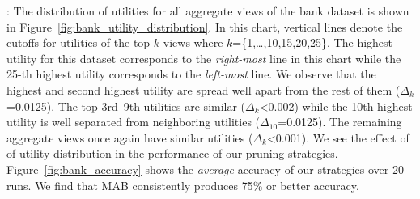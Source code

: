 :
The distribution of utilities for all aggregate views of the bank dataset is
shown in Figure~\ref{fig:bank_utility_distribution}. 
In this chart, vertical lines denote the cutoffs for utilities of the top-$k$ views
where $k$=\{1,\ldots,10,15,20,25\}.
The highest utility for this dataset corresponds to the {\it right-most} line
in this chart while the 25-th highest utility corresponds to the {\it left-most}
line. 
We observe that the highest and second highest utility are spread well apart 
from the rest of them ($\Delta_k$=0.0125). 
The top 3rd--9th utilities are similar ($\Delta_k$<0.002) while the 10th highest 
utility is well separated from neighboring utilities ($\Delta_{10}$=0.0125).
The remaining aggregate views once again have similar utilities ($\Delta_k$<0.001).
We see the effect of of utility distribution in the performance of our pruning 
strategies.
Figure~\ref{fig:bank_accuracy} shows the {\it average} accuracy of our strategies over 20 runs.
We find that MAB consistently produces 75\% or better accuracy.
